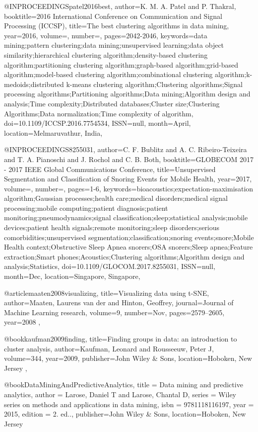 @INPROCEEDINGS{patel2016best, 
author={K. M. A. {Patel} and P. {Thakral}}, 
booktitle={2016 International Conference on Communication and Signal Processing (ICCSP)}, 
title={The best clustering algorithms in data mining}, 
year={2016}, 
volume={}, 
number={}, 
pages={2042-2046}, 
keywords={data mining;pattern clustering;data mining;unsupervised learning;data object similarity;hierarchical clustering algorithm;density-based clustering algorithm;partitioning clustering algorithm;graph-based algorithm;grid-based algorithm;model-based clustering algorithm;combinational clustering algorithm;k-medoids;distributed k-means clustering algorithm;Clustering algorithms;Signal processing algorithms;Partitioning algorithms;Data mining;Algorithm design and analysis;Time complexity;Distributed databases;Cluster size;Clustering Algorithms;Data normalization;Time complexity of algorithm}, 
doi={10.1109/ICCSP.2016.7754534}, 
ISSN={null}, 
month={April},
location={Melmaruvathur, India},
}

@INPROCEEDINGS{8255031, 
author={C. F. {Bublitz} and A. C. {Ribeiro-Teixeira} and T. A. {Pianoschi} and J. {Rochol} and C. B. {Both}}, 
booktitle={GLOBECOM 2017 - 2017 IEEE Global Communications Conference}, 
title={Unsupervised Segmentation and Classification of Snoring Events for Mobile Health}, 
year={2017}, 
volume={}, 
number={}, 
pages={1-6}, 
keywords={bioacoustics;expectation-maximisation algorithm;Gaussian processes;health care;medical disorders;medical signal processing;mobile computing;patient diagnosis;patient monitoring;pneumodynamics;signal classification;sleep;statistical analysis;mobile devices;patient health signals;remote monitoring;sleep disorders;serious comorbidities;unsupervised segmentation;classification;snoring events;snore;Mobile Health context;Obstructive Sleep Apnea snorers;OSA snorers;Sleep apnea;Feature extraction;Smart phones;Acoustics;Clustering algorithms;Algorithm design and analysis;Statistics}, 
doi={10.1109/GLOCOM.2017.8255031}, 
ISSN={null}, 
month={Dec},
location={Singapore, Singapore}},

@article{maaten2008visualizing,
  title={Visualizing data using t-SNE},
  author={Maaten, Laurens van der and Hinton, Geoffrey},
  journal={Journal of Machine Learning research},
  volume={9},
  number={Nov},
  pages={2579--2605},
  year={2008}
},

@book{kaufman2009finding,
  title={Finding groups in data: an introduction to cluster analysis},
  author={Kaufman, Leonard and Rousseeuw, Peter J},
  volume={344},
  year={2009},
  publisher={John Wiley \& Sons},
  location={Hoboken, New Jersey}
},

@book{DataMiningAndPredictiveAnalytics,
title = {Data mining and predictive analytics},
author = {Larose, Daniel T and Larose, Chantal D},
series = {Wiley series on methods and applications in data mining},
isbn = {9781118116197},
year = {2015},
edition = {2. ed..},
publisher={John Wiley \& Sons},
location={Hoboken, New Jersey}
}








